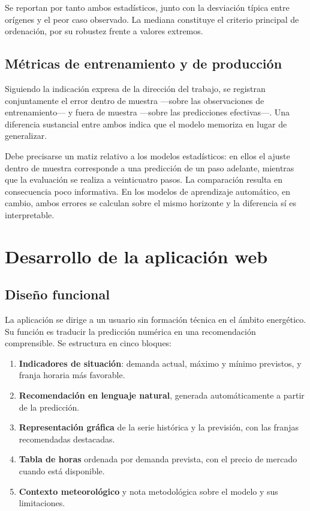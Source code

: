 Se reportan por tanto ambos estadísticos, junto con la desviación típica entre
orígenes y el peor caso observado. La mediana constituye el criterio principal de
ordenación, por su robustez frente a valores extremos.

\subsection*{Métricas de entrenamiento y de producción}

Siguiendo la indicación expresa de la dirección del trabajo, se registran
conjuntamente el error dentro de muestra —sobre las observaciones de
entrenamiento— y fuera de muestra —sobre las predicciones efectivas—. Una
diferencia sustancial entre ambos indica que el modelo memoriza en lugar de
generalizar.

Debe precisarse un matiz relativo a los modelos estadísticos: en ellos el ajuste
dentro de muestra corresponde a una predicción de un paso adelante, mientras que
la evaluación se realiza a veinticuatro pasos. La comparación resulta en
consecuencia poco informativa. En los modelos de aprendizaje automático, en
cambio, ambos errores se calculan sobre el mismo horizonte y la diferencia sí es
interpretable.



\section{Desarrollo de la aplicación web}

\subsection*{Diseño funcional}

La aplicación se dirige a un usuario sin formación técnica en el ámbito
energético. Su función es traducir la predicción numérica en una recomendación
comprensible. Se estructura en cinco bloques:

\begin{enumerate}
  \item \textbf{Indicadores de situación}: demanda actual, máximo y mínimo
        previstos, y franja horaria más favorable.
  \item \textbf{Recomendación en lenguaje natural}, generada automáticamente a
        partir de la predicción.
  \item \textbf{Representación gráfica} de la serie histórica y la previsión, con
        las franjas recomendadas destacadas.
  \item \textbf{Tabla de horas} ordenada por demanda prevista, con el precio de
        mercado cuando está disponible.
  \item \textbf{Contexto meteorológico} y nota metodológica sobre el modelo y sus
        limitaciones.
\end{enumerate}


